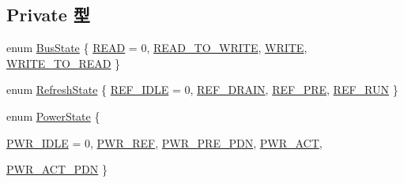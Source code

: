 \subsection*{Private 型}
\begin{DoxyCompactItemize}
\item 
enum \hyperlink{classDRAMCtrl_a167375ed712267f43fee8fa5d1aa4f11}{BusState} \{ \hyperlink{classDRAMCtrl_a167375ed712267f43fee8fa5d1aa4f11acb9be765f361bb7efb9073730aac92c6}{READ} =  0, 
\hyperlink{classDRAMCtrl_a167375ed712267f43fee8fa5d1aa4f11a12f0259011cf4a6cf10274abcf71daaa}{READ\_\-TO\_\-WRITE}, 
\hyperlink{classDRAMCtrl_a167375ed712267f43fee8fa5d1aa4f11a61aa7ff70b76bff0fda378cf61d6afbc}{WRITE}, 
\hyperlink{classDRAMCtrl_a167375ed712267f43fee8fa5d1aa4f11ad12c9fdf4a8009963c2eb263513e4aab}{WRITE\_\-TO\_\-READ}
 \}
\item 
enum \hyperlink{classDRAMCtrl_a5f4b1f67c62d22fa4cb3ec1f98b8edf5}{RefreshState} \{ \hyperlink{classDRAMCtrl_a5f4b1f67c62d22fa4cb3ec1f98b8edf5a0408d01a98c94c06e9b5f01e52b7e4b6}{REF\_\-IDLE} =  0, 
\hyperlink{classDRAMCtrl_a5f4b1f67c62d22fa4cb3ec1f98b8edf5ad23d9d9efbe62841456648a9292a4e77}{REF\_\-DRAIN}, 
\hyperlink{classDRAMCtrl_a5f4b1f67c62d22fa4cb3ec1f98b8edf5a24272ed749c86212cfa9092585b05592}{REF\_\-PRE}, 
\hyperlink{classDRAMCtrl_a5f4b1f67c62d22fa4cb3ec1f98b8edf5a590de673c457621a7d12606a2b2360f5}{REF\_\-RUN}
 \}
\item 
enum \hyperlink{classDRAMCtrl_aa59b8ef6374ae587f3c228eba57bdf80}{PowerState} \{ \par
\hyperlink{classDRAMCtrl_aa59b8ef6374ae587f3c228eba57bdf80ada4f1ff35db67e1783712214c08010f2}{PWR\_\-IDLE} =  0, 
\hyperlink{classDRAMCtrl_aa59b8ef6374ae587f3c228eba57bdf80a96cbccc90bf08cf55fb9ce1fde8fb984}{PWR\_\-REF}, 
\hyperlink{classDRAMCtrl_aa59b8ef6374ae587f3c228eba57bdf80ad70441288ec3dbe4fb80e814a1342f18}{PWR\_\-PRE\_\-PDN}, 
\hyperlink{classDRAMCtrl_aa59b8ef6374ae587f3c228eba57bdf80a7cdf09b08fcb323cdbd78014f98ab870}{PWR\_\-ACT}, 
\par
\hyperlink{classDRAMCtrl_aa59b8ef6374ae587f3c228eba57bdf80acb35a2366cd70ef3f0d263d22a3f3200}{PWR\_\-ACT\_\-PDN}
 \}
\end{DoxyCompactItemize}
